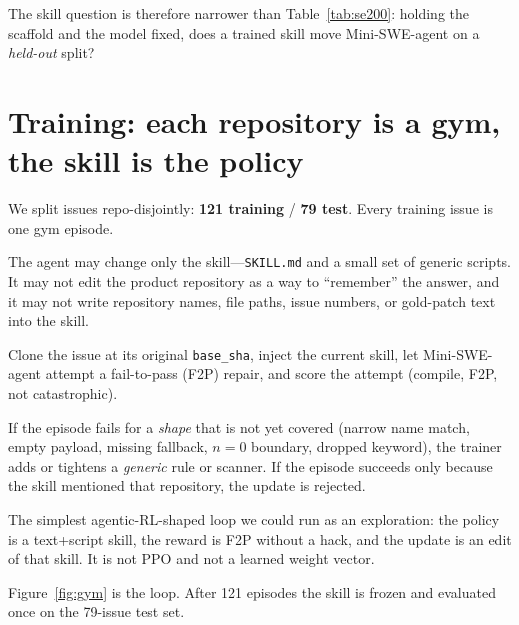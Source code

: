 \documentclass[11pt,a4paper]{article}
\begin{document}
The skill question is therefore narrower than Table~\ref{tab:se200}:
holding the scaffold and the model fixed, does a trained skill
move Mini-SWE-agent on a \emph{held-out} split?

\section{Training: each repository is a gym, the skill is the policy}
\label{sec:train}

We split issues repo-disjointly: \textbf{121 training} /
\textbf{79 test}. Every training issue is one gym episode.

\begin{description}[leftmargin=1.4em,style=nextline,font=\normalfont\bfseries]
\item[Action space.]
The agent may change only the skill---\texttt{SKILL.md} and a
small set of generic scripts. It may not edit the product
repository as a way to ``remember'' the answer, and it may not
write repository names, file paths, issue numbers, or gold-patch
text into the skill.
\item[Episode.]
Clone the issue at its original \texttt{base\_sha}, inject the
current skill, let Mini-SWE-agent attempt a fail-to-pass (F2P)
repair, and score the attempt (compile, F2P, not catastrophic).
\item[Update.]
If the episode fails for a \emph{shape} that is not yet covered
(narrow name match, empty payload, missing fallback, $n{=}0$
boundary, dropped keyword), the trainer adds or tightens a
\emph{generic} rule or scanner. If the episode succeeds only
because the skill mentioned that repository, the update is
rejected.
\item[What this is.]
The simplest agentic-RL-shaped loop we could run as an
exploration: the policy is a text+script skill, the reward is
F2P without a hack, and the update is an edit of that skill.
It is not PPO and not a learned weight vector.
\end{description}

Figure~\ref{fig:gym} is the loop. After 121 episodes the skill is
frozen and evaluated once on the 79-issue test set.
\end{document}
